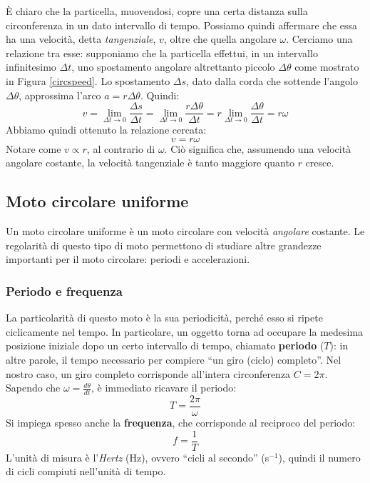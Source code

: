 È chiaro che la particella, muovendosi, copre una certa distanza sulla
circonferenza in un dato intervallo di tempo. Possiamo quindi affermare
che essa ha una velocità, detta \textit{tangenziale}, $v$, oltre che
quella angolare $\omega$. Cerciamo una relazione tra esse: supponiamo che
la particella effettui, in un intervallo infinitesimo $\Delta t$, uno
spostamento angolare altrettanto piccolo $\Delta\theta$ come mostrato in
Figura \ref{circspeed}. Lo spostamento $\Delta s$, dato dalla corda che
sottende l'angolo $\Delta\theta$, approssima l'arco $a = r\Delta\theta$. Quindi:
\[ v = \lim_{\Delta t \to 0}\frac{\Delta s}{\Delta t} = \lim_{\Delta t \to 0} \frac{r\Delta\theta}{\Delta t} = r\lim_{\Delta t \to 0}\frac{\Delta\theta}{\Delta t} = r\omega \]
Abbiamo quindi ottenuto la relazione cercata:
\[ v = r\omega \]
Notare come $v\propto r$, al contrario di $\omega$. Ciò significa che,
assumendo una velocità angolare costante, la velocità tangenziale è tanto
maggiore quanto $r$ cresce.

\subsection{Moto circolare uniforme}
Un moto circolare uniforme è un moto circolare con velocità \textit{angolare} costante.
Le regolarità di questo tipo di moto permettono di studiare altre grandezze
importanti per il moto circolare: periodi e accelerazioni.

\subsubsection*{Periodo e frequenza}
La particolarità di questo moto è la sua periodicità, perché esso si ripete
ciclicamente nel tempo. In particolare, un oggetto torna ad occupare la medesima
posizione iniziale dopo un certo intervallo di tempo, chiamato \textbf{periodo} ($T$):
in altre parole, il tempo necessario per compiere ``un giro (ciclo) completo''.
Nel nostro caso, un giro completo corrisponde all'intera circonferenza $C = 2\pi$.
Sapendo che $\omega = \frac{d\theta}{dt}$, è immediato ricavare il periodo:
\[ T = \frac{2\pi}{\omega} \]
Si impiega spesso anche la \textbf{frequenza}, che corrisponde al reciproco
del periodo:
\[ f = \frac{1}{T} \]
L'unità di misura è l'\textit{Hertz} (Hz), ovvero ``cicli al secondo'' (s$^{-1}$),
quindi il numero di cicli compiuti nell'unità di tempo.

